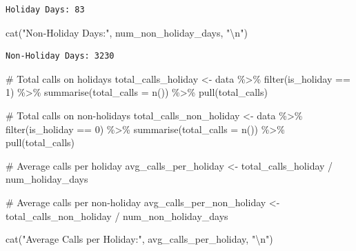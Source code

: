 \documentclass[
  letterpaper,
  DIV=11,
  numbers=noendperiod]{scrartcl}
\newenvironment{Shaded}{\begin{snugshade}}{\end{snugshade}}
\newcommand{\AttributeTok}[1]{\textcolor[rgb]{0.40,0.45,0.13}{#1}}
\newcommand{\CommentTok}[1]{\textcolor[rgb]{0.37,0.37,0.37}{#1}}
\newcommand{\DecValTok}[1]{\textcolor[rgb]{0.68,0.00,0.00}{#1}}
\newcommand{\FunctionTok}[1]{\textcolor[rgb]{0.28,0.35,0.67}{#1}}
\newcommand{\NormalTok}[1]{\textcolor[rgb]{0.00,0.23,0.31}{#1}}
\newcommand{\OtherTok}[1]{\textcolor[rgb]{0.00,0.23,0.31}{#1}}
\newcommand{\SpecialCharTok}[1]{\textcolor[rgb]{0.37,0.37,0.37}{#1}}
\newcommand{\StringTok}[1]{\textcolor[rgb]{0.13,0.47,0.30}{#1}}
\begin{document}
\begin{verbatim}
Holiday Days: 83 
\end{verbatim}

\begin{Shaded}
\begin{Highlighting}[]
\FunctionTok{cat}\NormalTok{(}\StringTok{"Non{-}Holiday Days:"}\NormalTok{, num\_non\_holiday\_days, }\StringTok{"}\SpecialCharTok{\textbackslash{}n}\StringTok{"}\NormalTok{)}
\end{Highlighting}
\end{Shaded}

\begin{verbatim}
Non-Holiday Days: 3230 
\end{verbatim}

\begin{Shaded}
\begin{Highlighting}[]
\CommentTok{\# Total calls on holidays}
\NormalTok{total\_calls\_holiday }\OtherTok{\textless{}{-}}\NormalTok{ data }\SpecialCharTok{\%\textgreater{}\%}
  \FunctionTok{filter}\NormalTok{(is\_holiday }\SpecialCharTok{==} \DecValTok{1}\NormalTok{) }\SpecialCharTok{\%\textgreater{}\%}
  \FunctionTok{summarise}\NormalTok{(}\AttributeTok{total\_calls =} \FunctionTok{n}\NormalTok{()) }\SpecialCharTok{\%\textgreater{}\%}
  \FunctionTok{pull}\NormalTok{(total\_calls)}

\CommentTok{\# Total calls on non{-}holidays}
\NormalTok{total\_calls\_non\_holiday }\OtherTok{\textless{}{-}}\NormalTok{ data }\SpecialCharTok{\%\textgreater{}\%}
  \FunctionTok{filter}\NormalTok{(is\_holiday }\SpecialCharTok{==} \DecValTok{0}\NormalTok{) }\SpecialCharTok{\%\textgreater{}\%}
  \FunctionTok{summarise}\NormalTok{(}\AttributeTok{total\_calls =} \FunctionTok{n}\NormalTok{()) }\SpecialCharTok{\%\textgreater{}\%}
  \FunctionTok{pull}\NormalTok{(total\_calls)}

\CommentTok{\# Average calls per holiday}
\NormalTok{avg\_calls\_per\_holiday }\OtherTok{\textless{}{-}}\NormalTok{ total\_calls\_holiday }\SpecialCharTok{/}\NormalTok{ num\_holiday\_days}

\CommentTok{\# Average calls per non{-}holiday}
\NormalTok{avg\_calls\_per\_non\_holiday }\OtherTok{\textless{}{-}}\NormalTok{ total\_calls\_non\_holiday }\SpecialCharTok{/}\NormalTok{ num\_non\_holiday\_days}

\FunctionTok{cat}\NormalTok{(}\StringTok{"Average Calls per Holiday:"}\NormalTok{, avg\_calls\_per\_holiday, }\StringTok{"}\SpecialCharTok{\textbackslash{}n}\StringTok{"}\NormalTok{)}
\end{Highlighting}
\end{Shaded}
\end{document}

